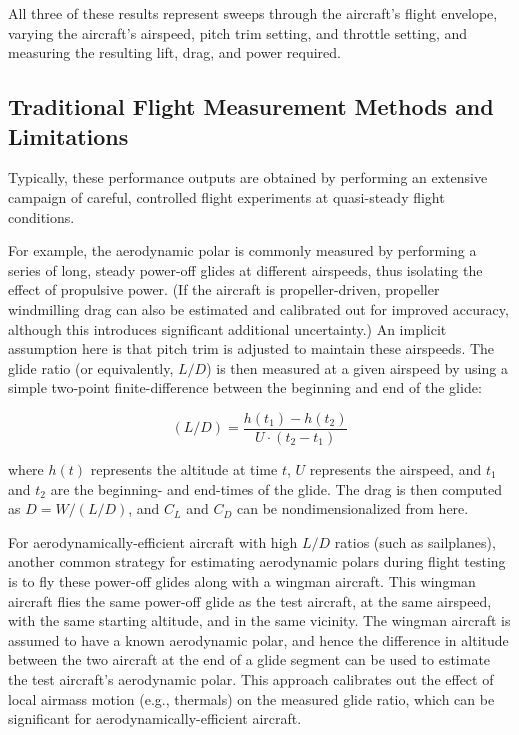 All three of these results represent sweeps through the aircraft's flight envelope, varying the aircraft's airspeed, pitch trim setting, and throttle setting, and measuring the resulting lift, drag, and power required.

\subsection{Traditional Flight Measurement Methods and Limitations}

Typically, these performance outputs are obtained by performing an extensive campaign of careful, controlled flight experiments at quasi-steady flight conditions.

For example, the aerodynamic polar is commonly measured by performing a series of long, steady power-off glides at different airspeeds, thus isolating the effect of propulsive power. (If the aircraft is propeller-driven, propeller windmilling drag can also be estimated and calibrated out for improved accuracy, although this introduces significant additional uncertainty.) An implicit assumption here is that pitch trim is adjusted to maintain these airspeeds. The glide ratio (or equivalently, $L/D$) is then measured at a given airspeed by using a simple two-point finite-difference between the beginning and end of the glide:

$$(L/D) = \frac{h(t_1) - h(t_2)}{U \cdot (t_2 - t_1)}$$

where $h(t)$ represents the altitude at time $t$, $U$ represents the airspeed, and $t_1$ and $t_2$ are the beginning- and end-times of the glide. The drag is then computed as $D = W / (L/D)$, and $C_L$ and $C_D$ can be nondimensionalized from here.

For aerodynamically-efficient aircraft with high $L/D$ ratios (such as sailplanes), another common strategy for estimating aerodynamic polars during flight testing is to fly these power-off glides along with a wingman aircraft. This wingman aircraft flies the same power-off glide as the test aircraft, at the same airspeed, with the same starting altitude, and in the same vicinity. The wingman aircraft is assumed to have a known aerodynamic polar, and hence the difference in altitude between the two aircraft at the end of a glide segment can be used to estimate the test aircraft's aerodynamic polar. This approach calibrates out the effect of local airmass motion (e.g., thermals) on the measured glide ratio, which can be significant for aerodynamically-efficient aircraft.

